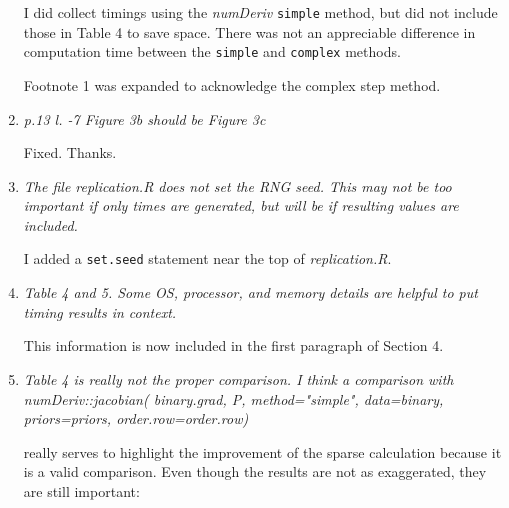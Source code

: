 \documentclass{article}
\newcommand{\pkg}[1]{\emph{#1}}
\newcommand{\filename}[1]{\textit{#1}}
\newcommand{\code}[1]{\texttt{#1}}
\newcommand{\func}[1]{\code{#1}}
\newcommand{\method}[1]{\func{#1}}
\newenvironment{revQuote}{\itshape}{\vspace{\baselineskip}}
\newenvironment{response}{\normalfont}{\vspace{\baselineskip}}
\begin{document}
\begin{enumerate}[align=left]
\begin{response}
I did collect timings using the \pkg{numDeriv} \method{simple} method,
but did not include those in Table 4 to save space.  There was not an
appreciable difference in computation time between the \method{simple}
and \method{complex} methods.

Footnote 1 was expanded to acknowledge the complex step method.



\end{response}


\item \begin{revQuote}
 p.13  l. -7  Figure 3b  should be Figure 3c
  \end{revQuote}

\begin{response}
  Fixed.  Thanks.
\end{response}


\item \begin{revQuote}
 The file replication.R does not set the RNG seed. This may not be too
important if only times are generated, but will be if resulting values are
included.
    
  \end{revQuote}

\begin{response}
  I added a \func{set.seed} statement near the top of \filename{replication.R}.
\end{response}


\item \begin{revQuote}
Table 4 and 5. Some OS, processor, and memory details are helpful to put
timing results in context.
  \end{revQuote}

\begin{response}
  This information is now included in the first paragraph of Section 4.
\end{response}


\item\begin{revQuote}
Table 4 is really not the proper comparison. I think a comparison with
       numDeriv::jacobian( binary.grad, P, method="simple", 
                   data=binary, priors=priors,
order.row=order.row)

really serves to highlight the improvement of the sparse calculation because
it is a valid comparison. Even though the results are not as exaggerated,
they are still important:


\end{revQuote}
\end{enumerate}
\end{document}
